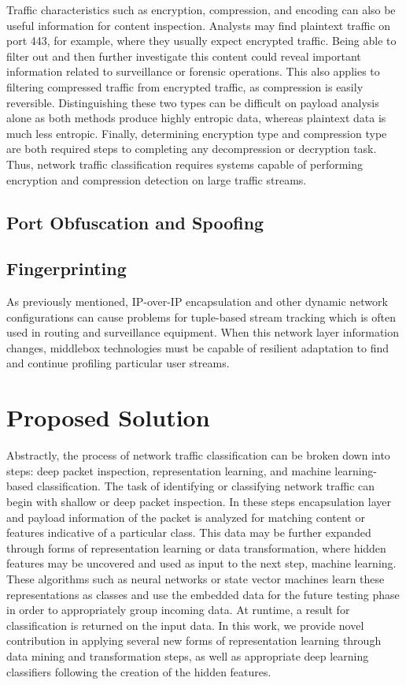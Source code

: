 Traffic characteristics such as encryption, compression, and encoding can also be useful information for content inspection. Analysts may find plaintext traffic on port 443, for example, where they usually expect encrypted traffic. Being able to filter out and then further investigate this content could reveal important information related to surveillance or forensic operations. This also applies to filtering compressed traffic from encrypted traffic, as compression is easily reversible. Distinguishing these two types can be difficult on payload analysis alone as both methods produce highly entropic data, whereas plaintext data is much less entropic. Finally, determining encryption type and compression type are both required steps to completing any decompression or decryption task. Thus, network traffic classification requires systems capable of performing encryption and compression detection on large traffic streams.

\subsection{Port Obfuscation and Spoofing}


\subsection{Fingerprinting}

As previously mentioned, IP-over-IP encapsulation and other dynamic network configurations can cause problems for tuple-based stream tracking which is often used in routing and surveillance equipment. When this network layer information changes, middlebox technologies must be capable of resilient adaptation to find and continue profiling particular user streams.

\section{Proposed Solution}

Abstractly, the process of network traffic classification can be broken down into steps: deep packet inspection, representation learning, and machine learning-based classification. The task of identifying or classifying network traffic can begin with shallow or deep packet inspection. In these steps encapsulation layer and payload information of the packet is analyzed for matching content or features indicative of a particular class. This data may be further expanded through forms of representation learning or data transformation, where hidden features may be uncovered and used as input to the next step, machine learning. These algorithms such as neural networks or state vector machines learn these representations as classes and use the embedded data for the future testing phase in order to appropriately group incoming data. At runtime, a result for classification is returned on the input data. In this work, we provide novel contribution in applying several new forms of representation learning through data mining and transformation steps, as  well as appropriate deep learning classifiers following the creation of the hidden features.

